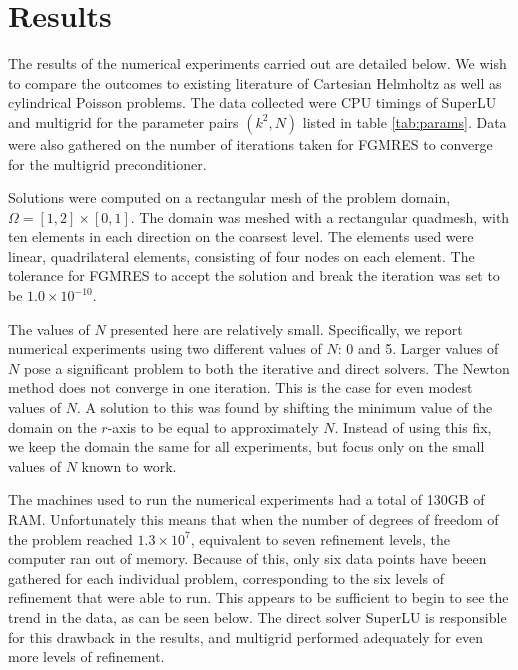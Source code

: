 \chapter{Results}

\def\figwidth{0.7\columnwidth}

\def \mgcol {red}
\def \lucol {black}

\def \helmholtzfolder {data/output_k_100_n_5}
\def \poissonfolder {data/output_k_0_n_5}
\def \axisymmpoisson {data/output_k_0_n_0}
\def \axisymhelmholtz {data/output_k_10_n_0}



The results of the numerical experiments carried out are detailed below.
We wish to compare the outcomes to existing literature of Cartesian Helmholtz as well as cylindrical Poisson problems.
The data collected were CPU timings of SuperLU and multigrid for the parameter pairs $(k^2,N)$ listed in table \ref{tab:params}.
Data were also gathered on the number of iterations taken for FGMRES to converge for the multigrid preconditioner.

Solutions were computed on a rectangular mesh of the problem domain, $\Omega = [1,2] \times [0,1]$.
The domain was meshed with a rectangular quadmesh, with ten elements in each direction on the coarsest level.
The elements used were linear, quadrilateral elements, consisting of four nodes on each element.
The tolerance for FGMRES to accept the solution and break the iteration was set to be $1.0\times 10^{-10}$.

The values of $N$ presented here are relatively small.
Specifically, we report numerical experiments using two different values of $N$: 0 and 5.
Larger values of $N$ pose a significant problem to both the iterative and direct solvers.
The Newton method does not converge in one iteration.
This is the case for even modest values of $N$.
A solution to this was found by shifting the minimum value of the domain on the $r$-axis to be equal to approximately $N$.
Instead of using this fix, we keep the domain the same for all experiments, but focus only on the small values of $N$ known to work.

The machines used to run the numerical experiments had a total of 130GB of RAM.
Unfortunately this means that when the number of degrees of freedom of the problem reached $1.3\times 10^7$, equivalent to seven refinement levels, the computer ran out of memory.
Because of this, only six data points have beeen gathered for each individual problem, corresponding to the six levels of refinement that were able to run.
This appears to be sufficient to begin to see the trend in the data, as can be seen below.
The direct solver SuperLU is responsible for this drawback in the results, and multigrid performed adequately for even more levels of refinement.


